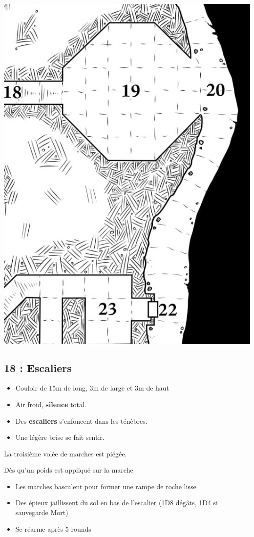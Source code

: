 \newpage
\includegraphics[width=\columnwidth]{pics/map_18-23.jpg}

\subsection{18 : Escaliers}\label{n2:s18}
\begin{itemize}
  \item Couloir de 15m de long, 3m de large et 3m de haut
  \item Air froid, \textbf{silence} total.
  \item Des \textbf{escaliers} s'enfoncent dans les ténèbres.
  \item Une légère brise se fait sentir.
\end{itemize}

La troisième volée de marches est piégée.

\begin{highlight}[Piège]
Dès qu'un poids est appliqué sur la marche
\begin{itemize}
    \item Les marches basculent pour former une rampe de roche lisse
    \item Des épieux jaillissent du sol en bas de l'escalier (1D8 dégâts, 1D4 si sauvegarde Mort)
    \item Se réarme après 5 rounds
\end{itemize}
\end{highlight}

